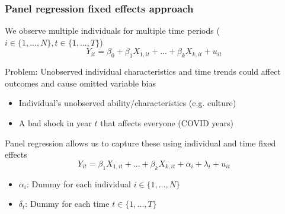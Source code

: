\documentclass[aspectratio=169]{beamer}
\newenvironment{wideitemize}{\itemize\addtolength{\itemsep}{10pt}}{\enditemize}
\begin{document}
\begin{frame}
\frametitle{Panel regression fixed effects approach} 
\begin{wideitemize}
\item We observe multiple individuals for multiple time periods ($i\in \{1,...,N\}, t\in \{1,...,T\}$)
\[
Y_{it} = \beta_0 + \beta_1X_{1,it}+ ... +\beta_kX_{k,it}+u_{it}
\]
\item Problem: Unobserved individual characteristics and time trends could affect outcomes and cause omitted variable bias
\begin{itemize}
\item Individual's unobserved ability/characteristics (e.g. culture)
\item A bad shock in year $t$ that affects everyone (COVID years)
\end{itemize}
\item Panel regression allows us to capture these using individual and time fixed effects\
\[
Y_{it}=\beta_1 X_{1,it}+...+\beta_k X_{k,it} + \alpha_i +\lambda_t + u_{it}
\]
\begin{itemize}
\item $\alpha_i$: Dummy for each individual $i\in\{1,...,N\}$
\item $\delta_t$: Dummy for each time $t\in\{1,...,T\}$
\end{itemize}
\end{wideitemize}
\end{frame}
\end{document}
